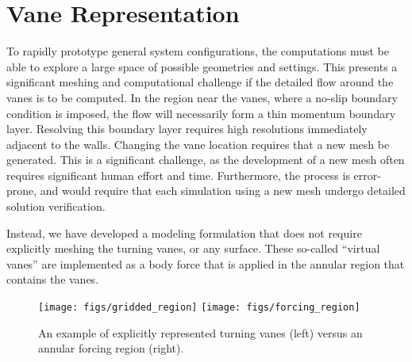 \section{Vane Representation}
\label{subsec:vane}
To rapidly prototype general system configurations, the
computations must be able to explore a large space of possible
geometries and settings. This presents a significant meshing and 
computational challenge if the detailed flow around the vanes is to be
computed. In the region near the vanes, where a no-slip boundary
condition is imposed, the flow will necessarily form a thin momentum
boundary layer. Resolving this boundary layer requires high resolutions
immediately adjacent to the walls. Changing the vane location requires
that a new mesh be generated. This is a significant
challenge, as the development of a new mesh often requires significant
human effort and time. Furthermore, the process is error-prone, 
and would require that each simulation using a new mesh undergo 
detailed solution verification. 



Instead, we have developed a modeling formulation that does not require
explicitly meshing the turning vanes, or any surface. These so-called
``virtual vanes'' are implemented as a body force that 
is applied in the annular region that contains the vanes. 

   \begin{figure}[!htb]
    \centering
    \texttt{[image: figs/gridded\_region]}
    \hfill
    \texttt{[image: figs/forcing\_region]}
     \caption{An example of explicitly represented turning vanes (left)
    versus an annular forcing region (right).}
     \label{fig:penalty_model}
   \end{figure}


